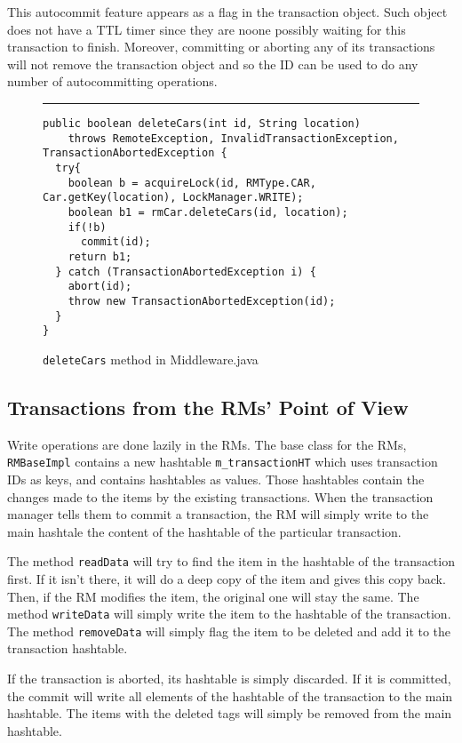 \documentclass[12pt]{article}
\theoremstyle{plain}%
\theoremstyle{definition}
\theoremstyle{remark}
\newcommand{\java}[1]{{\lstinline!#1!}}
\newenvironment{figureone}[1]{%
  \def\deffigurecaption{#1}%
  \begin{figure}[htbp]%
  \begin{center}%
  \begin{minipage}{\columnwidth}%
  \hrule \vspace*{2ex}%
}{%
  \end{minipage}%
  \end{center}%
  \caption{\deffigurecaption}%
  \end{figure}%
}
\begin{document}
This autocommit feature appears as a flag in the transaction object. Such object does not have a TTL timer since they are noone possibly waiting for this transaction to finish. Moreover, committing or aborting any of its transactions will not remove the transaction object and so the ID can be used to do any number of autocommitting operations.  


\begin{figureone}{\java{deleteCars} method in Middleware.java \label{fig:operation}}
\begin{lstlisting}
public boolean deleteCars(int id, String location)
    throws RemoteException, InvalidTransactionException, TransactionAbortedException {
  try{
    boolean b = acquireLock(id, RMType.CAR, Car.getKey(location), LockManager.WRITE);
    boolean b1 = rmCar.deleteCars(id, location);
    if(!b)
      commit(id);
    return b1;
  } catch (TransactionAbortedException i) {
    abort(id);
    throw new TransactionAbortedException(id);
  }
}
\end{lstlisting}
\end{figureone}


\subsection*{Transactions from the RMs' Point of View}

Write operations are done lazily in the RMs. The base class for the RMs, \java{RMBaseImpl} contains a new hashtable \java{m_transactionHT} which uses transaction IDs as keys, and contains hashtables as values. Those hashtables contain the changes made to the items by the existing transactions. When the transaction manager tells them to commit a transaction, the RM will simply write to the main hashtale the content of the hashtable of the particular transaction.

The method \java{readData} will try to find the item in the hashtable of the transaction first. If it isn't there, it will do a deep copy of the item and gives this copy back. Then, if the RM modifies the item, the original one will stay the same. The method \java{writeData} will simply write the item to the hashtable of the transaction. The method \java{removeData} will simply flag the item to be deleted and add it to the transaction hashtable.

If the transaction is aborted, its hashtable is simply discarded. If it is committed, the commit will write all elements of the hashtable of the transaction to the main hashtable. The items with the deleted tags will simply be removed from the main hashtable.
\end{document}
